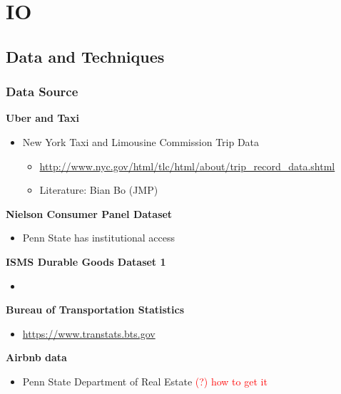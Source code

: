 \documentclass{book}
\theoremstyle{plain}
\theoremstyle{definition}
\begin{document}




\part{IO} %
\label{part:io}

\chapter{Data and Techniques} %
\label{cha:data_and_techniques}

\section{Data Source} %
\label{sec:data_source}

\noindent
\textbf{Uber and Taxi}
\begin{itemize}
	\item New York Taxi and Limousine Commission Trip Data
	\begin{itemize}
		\item \url{http://www.nyc.gov/html/tlc/html/about/trip_record_data.shtml}
		\item Literature: Bian Bo (JMP)
	\end{itemize}
\end{itemize}


\noindent
\textbf{Nielson Consumer Panel Dataset}
\begin{itemize}
	\item Penn State has institutional access
\end{itemize}

\noindent
\textbf{ISMS Durable Goods Dataset 1}
\begin{itemize}
	\item {}
\end{itemize}

\noindent
\textbf{Bureau of Transportation Statistics}
\begin{itemize}
	\item \url{https://www.transtats.bts.gov}
\end{itemize}

\noindent
\textbf{Airbnb data}
\begin{itemize}
	\item Penn State Department of Real Estate \textcolor{red}{(?) how to get it}
\end{itemize}
\end{document}
